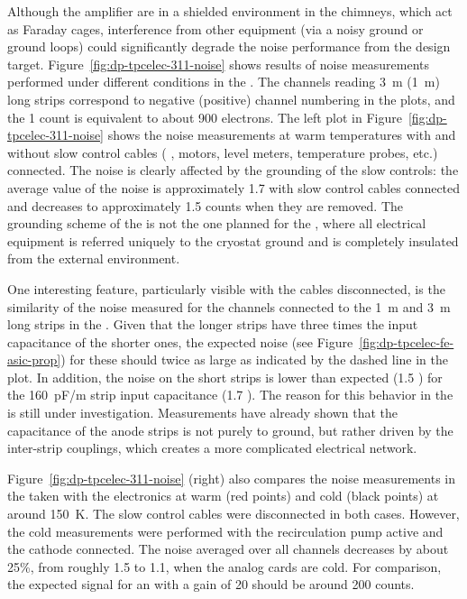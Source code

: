 Although the  amplifier  are in a shielded environment in the chimneys, which act as Faraday cages, interference from other equipment (via a noisy ground or ground loops) could significantly degrade %
the noise performance from the design target. Figure~\ref{fig:dp-tpcelec-311-noise} shows results of noise measurements performed under different conditions in the . The channels reading \SI{3}{\meter} (\SI{1}{\metre}) long strips correspond to negative (positive) channel numbering in the plots, and the \num{1}  count is equivalent to about \num{900} electrons. The left plot in Figure~\ref{fig:dp-tpcelec-311-noise} shows the noise measurements at warm temperatures with and without slow control cables ( ,  motors, level meters, temperature probes, etc.) connected. The noise is clearly affected by the grounding of the slow controls: the average value of the noise \rms is approximately \num{1.7}  with slow control cables connected and decreases to approximately \num{1.5}  counts when they are removed. The grounding scheme of the  is not the one planned for the , where all electrical equipment is referred uniquely to the cryostat ground and is completely insulated from the external environment. 

One interesting feature, particularly visible with the cables disconnected, is the similarity of the noise measured for the channels connected to the \SI{1}{\meter} and \SI{3}{\meter} long strips in the . Given that the longer strips have three times the input capacitance of the shorter ones, the expected noise (see Figure~\ref{fig:dp-tpcelec-fe-asic-prop}) for these should twice as large as indicated by the dashed line in the plot. In addition, the noise on the short strips is lower than expected (\num{1.5} ) for the \SI{160}{pF/m} strip input capacitance (\num{1.7} ). The reason for this behavior in the  is still under investigation. Measurements have already shown that the capacitance of the  anode strips is not purely to ground, but rather driven by the inter-strip couplings, which creates a more complicated electrical network. 

Figure~\ref{fig:dp-tpcelec-311-noise} (right) also compares the noise measurements in the  taken with the  electronics at warm (red points) and cold (black points) at around \SI{150}{\kelvin}. The slow control cables were disconnected in both cases. However, the cold measurements were performed with the recirculation pump active and the cathode  connected. The \rms noise averaged over all channels decreases by about 25\%, from roughly \SI{1.5}{} to \SI{1.1}{}, when the  analog cards are cold. For comparison, the expected signal for an  with a  gain of \num{20} should be around \SI{200}{} counts. 

